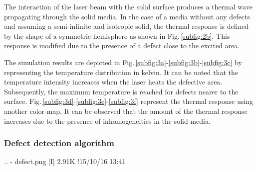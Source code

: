 \documentclass[12pt]{spieman}
\begin{document}
\begin{spacing}{2}
  


The interaction of the laser beam with the solid surface produces a thermal wave propagating through the solid media. In the case of a media without any defects and assuming a semi-infinite and isotropic solid, the thermal response is defined by the shape of a symmetric hemisphere\cite{Li2011} as shown in Fig.\,\ref{subfig:2b}. This response is modified due to the presence of a defect close to the excited area.

The simulation results are depicted in Fig.\,\ref{subfig:3a}-\ref{subfig:3b}-\ref{subfig:3c} by representing the temperature distribution in kelvin. It can be noted that the temperature intensity increases when the laser heats the defective area. Subsequently, the maximum temperature is reached for defects nearer to the surface. Fig.\,\ref{subfig:3d}-\ref{subfig:3e}-\ref{subfig:3f} represent the thermal response using another color-map. It can be observed that the amount of the thermal response increases due to the presence of inhomogeneities in the solid media.
	
\subsubsection{Defect detection algorithm}\label{subsec:312}
..
- defect.png                                                   [I]  2.91K !15/10/16 13:41


\end{spacing}
\end{document}
